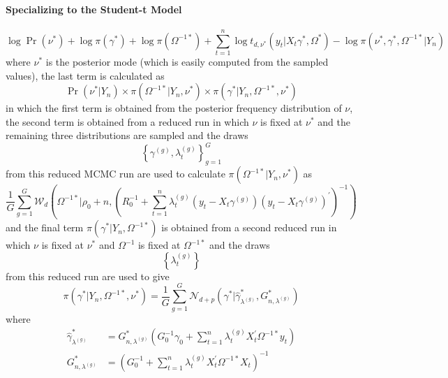 \documentclass[12pt]{article}
\begin{document}
\paragraph{Specializing to the Student-t Model}
\begin{equation*}
\log \Pr \left( \nu ^{\ast }\right) +\log \pi \left( \gamma ^{\ast }\right)
+\log \pi \left( \Omega ^{-1\ast }\right) +\sum_{t=1}^{n}\log t_{d,\nu
^{\ast }}\left( y_{t}|X_{t}\gamma ^{\ast },\Omega ^{\ast }\right) -\log \pi
\left( \nu ^{\ast },\gamma ^{\ast },\Omega ^{-1\ast }|Y_{n}\right)
\end{equation*}%
where $\nu ^{\ast }$ is the posterior mode (which is easily computed from
the sampled values), the last term is calculated as%
\begin{equation*}
\Pr \left( \nu ^{\ast }|Y_{n}\right) \times \pi \left( \Omega ^{-1\ast
}|Y_{n},\nu ^{\ast }\right) \times \pi \left( \gamma ^{\ast }|Y_{n},\Omega
^{-1\ast },\nu ^{\ast }\right)
\end{equation*}%
in which the first term is obtained from the posterior frequency
distribution of $\nu $, the second term is obtained from a reduced run in
which $\nu $ is fixed at $\nu ^{\ast }$ and the remaining three
distributions are sampled and the draws
\begin{equation*}
\left\{ \gamma ^{(g)},\lambda _{t}^{(g)}\right\} _{g=1}^{G}
\end{equation*}%
from this reduced MCMC run are used to calculate $\pi \left( \Omega ^{-1\ast
}|Y_{n},\nu ^{\ast }\right) $ as
\begin{equation*}
\frac{1}{G}\sum_{g=1}^{G}\mathcal{W}_{d}\left( \Omega ^{-1\ast }|\rho
_{0}+n,\left( R_{0}^{-1}+\sum_{t=1}^{n}\lambda _{t}^{(g)}\left(
y_{t}-X_{t}\gamma ^{(g)}\right) \left( y_{t}-X_{t}\gamma ^{(g)}\right)
^{\prime }\right) ^{-1}\right)
\end{equation*}%
and the final term $\pi \left( \gamma ^{\ast }|Y_{n},\Omega ^{-1\ast
}\right) $ is obtained from a second reduced run in which $\nu $ is fixed at
$\nu ^{\ast }$ and $\Omega ^{-1}$ is fixed at $\Omega ^{-1\ast }$ and the
draws
\begin{equation*}
\left\{ \lambda _{t}^{(g)}\right\}
\end{equation*}%
from this reduced run are used to give
\begin{equation*}
\pi (\gamma ^{\ast }|Y_{n},\Omega ^{-1\ast },\nu ^{\ast })=\frac{1}{G}%
\sum_{g=1}^{G}\mathcal{N}_{d+p}\left( \gamma ^{\ast }|\hat{\gamma}_{\lambda
^{(g)}}^{\ast },G_{n,\lambda ^{(g)}}^{\ast }\right)
\end{equation*}%
where%
\begin{align*}
\hat{\gamma}_{\lambda ^{(g)}}^{\ast }& =G_{n,\lambda ^{(g)}}^{\ast }\left(
G_{0}^{-1}\gamma _{0}+\sum_{t=1}^{n}\lambda _{t}^{(g)}X_{t}^{\prime }\Omega
^{-1\ast }y_{t}\right)  \\
G_{n,\lambda ^{(g)}}^{\ast }& =\left( G_{0}^{-1}+\sum_{t=1}^{n}\lambda
_{t}^{(g)}X_{t}^{\prime }\Omega ^{-1\ast }X_{t}\right) ^{-1}
\end{align*}
\end{document}
